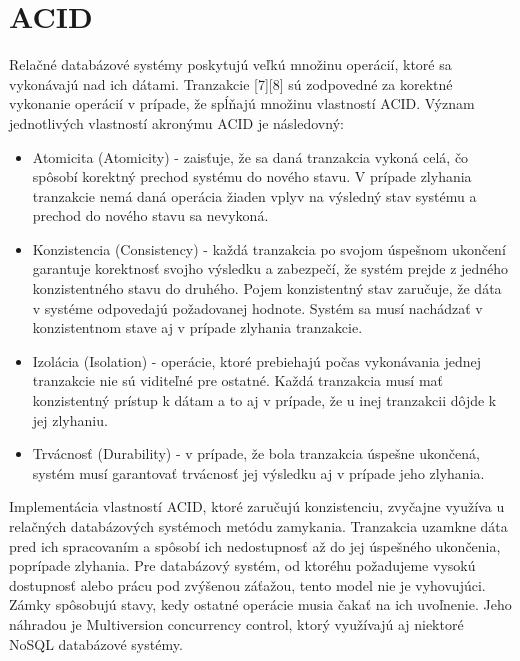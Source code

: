 \documentclass[11pt,twoside,a4paper]{book}
\begin{document}
\section{ACID}

Relačné databázové systémy poskytujú veľkú množinu operácií, ktoré sa vykonávajú nad ich  dátami. Tranzakcie [7][8] sú zodpovedné za korektné vykonanie operácií v prípade, že spĺňajú množinu vlastností ACID. Význam jednotlivých vlastností akronýmu ACID je následovný:

\begin{itemize}
  \item Atomicita (Atomicity) - zaisťuje, že sa daná tranzakcia vykoná celá, čo spôsobí korektný prechod systému do nového stavu. V prípade zlyhania tranzakcie nemá daná operácia žiaden vplyv na výsledný stav systému a prechod do nového stavu sa nevykoná.
  \item Konzistencia (Consistency) - každá tranzakcia po svojom úspešnom ukončení garantuje korektnosť svojho výsledku a zabezpečí, že systém prejde z jedného konzistentného stavu do druhého. Pojem konzistentný stav zaručuje, že dáta v systéme odpovedajú požadovanej hodnote. Systém sa musí nachádzať v konzistentnom stave aj v prípade zlyhania tranzakcie.
  \item Izolácia (Isolation) - operácie, ktoré prebiehajú počas vykonávania jednej tranzakcie nie sú viditeľné pre ostatné. Každá tranzakcia musí mať konzistentný prístup k dátam a to aj v prípade, že u inej tranzakcii dôjde k jej zlyhaniu.
  \item Trvácnosť (Durability) - v prípade, že bola tranzakcia úspešne ukončená, systém musí garantovať trvácnosť jej výsledku aj v prípade jeho zlyhania.
\end{itemize}

Implementácia vlastností ACID, ktoré zaručujú konzistenciu, zvyčajne využíva u relačných databázových systémoch metódu zamykania. Tranzakcia uzamkne dáta pred ich spracovaním a spôsobí ich nedostupnosť až do jej úspešného ukončenia, poprípade zlyhania. Pre databázový systém, od ktoréhu požadujeme vysokú dostupnosť alebo prácu pod zvýšenou záťažou, tento model nie je vyhovujúci. Zámky spôsobujú stavy, kedy ostatné operácie musia čakať na ich uvoľnenie. Jeho náhradou je Multiversion concurrency control, ktorý využívajú aj niektoré NoSQL databázové systémy.
\end{document}
